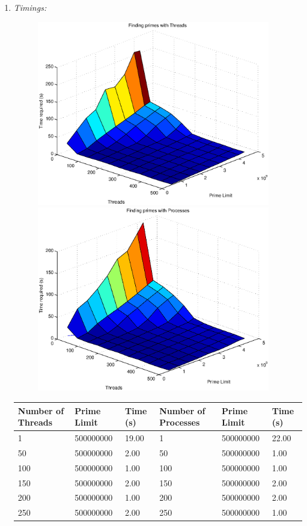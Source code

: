 \documentclass[letterpaper,10pt,titlepage]{article}
\begin{document}
\begin{enumerate}
\item \emph{Timings:}
\begin{figure}[H] %
  \includegraphics[width=4in]{tplot}
  \includegraphics[width=4in]{pplot}
\end{figure}
\begin{tabular}{| l | l | l | l | l | l |}
\hline Number of Threads & Prime Limit & Time (s) & Number of Processes & Prime Limit & Time (s) \\ 
\hline 1 & 500000000 & 19.00 & 1 & 500000000 & 22.00 \\
\hline 50 & 500000000 & 2.00 & 50 & 500000000 & 1.00 \\
\hline 100 & 500000000 & 1.00 & 100 & 500000000 & 1.00 \\
\hline 150 & 500000000 & 2.00 & 150 & 500000000 & 2.00 \\
\hline 200 & 500000000 & 1.00 & 200 & 500000000 & 2.00 \\
\hline 250 & 500000000 & 2.00 & 250 & 500000000 & 1.00 \\

\end{tabular}
\end{enumerate}
\end{document}
